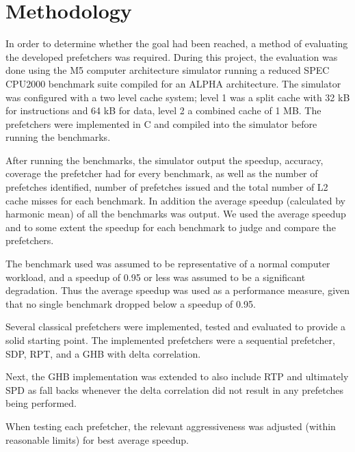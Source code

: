 \section{Methodology}
\label{sec:methodology}

In order to determine whether the goal had been reached, a method of evaluating the developed prefetchers was required.
During this project, the evaluation was done using the M5 computer architecture simulator running a reduced SPEC CPU2000 benchmark suite compiled for an ALPHA architecture.
The simulator was configured with a two level cache system; level 1 was a split cache with 32 kB for instructions and 64 kB for data, level 2 a combined cache of 1 MB.
The prefetchers were implemented in C and compiled into the simulator before running the benchmarks.


After running the benchmarks, the simulator output the speedup, accuracy, coverage the prefetcher had for every benchmark, as well as the number of prefetches identified,
number of prefetches issued and the total number of L2 cache misses for each benchmark. In addition the average speedup (calculated by harmonic mean) of all the benchmarks
was output. We used the average speedup and to some extent the speedup for each benchmark to judge and compare the prefetchers.

The benchmark used was assumed to be representative of a normal computer workload, and a speedup of 0.95 or less was assumed to be a significant degradation.
Thus the average speedup was used as a performance measure, given that no single benchmark dropped below a speedup of 0.95.

Several classical prefetchers were implemented, tested and evaluated to provide a solid starting point.
The implemented prefetchers were a sequential prefetcher, SDP, RPT, and a GHB with delta correlation.

Next, the GHB implementation was extended to also include RTP and ultimately SPD as fall backs whenever the delta correlation did not result in any prefetches being performed.

When testing each prefetcher, the relevant aggressiveness was adjusted (within reasonable limits) for best average speedup.
